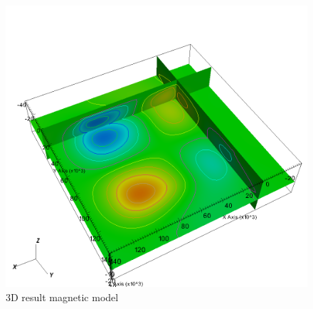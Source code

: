 \begin{figure}
\centering
\includegraphics[width=\textwidth]{joint3D4mag6grav-m.png}
\caption{3D result magnetic model}

\end{figure}

